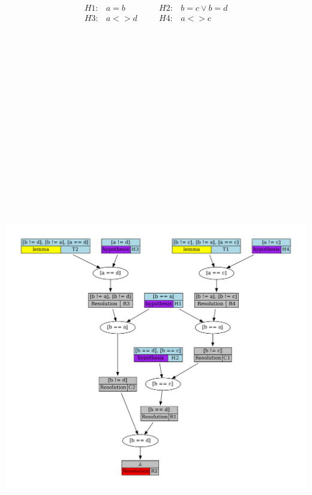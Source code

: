 \documentclass[portrait,a0,final]{a0poster}
\begin{document}
\begin{center}
\begin{multicols}{2}
{
  \vspace{.5cm}
  \[
  \begin{matrix}
    H1: & a = b   & \quad & H2: & b = c \lor b = d \\
    H3: & a <> d  & \quad & H4: & a <> c \\
  \end{matrix}
  \]
  \includegraphics[height=33cm]{proof}
}


\end{multicols}
\end{center}
\end{document}
